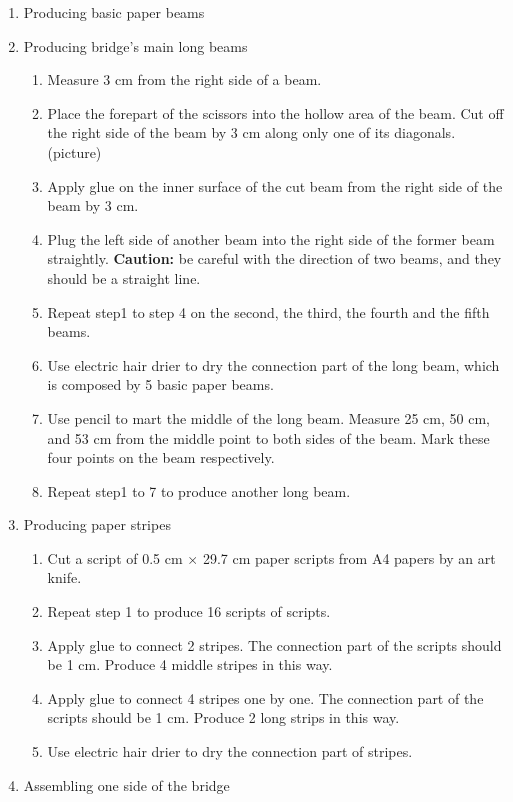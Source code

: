 \begin{enumerate}
\item Producing basic paper beams
\item Producing bridge’s main long beams
	\begin{enumerate}
	\item Measure 3 cm from the right side of a beam.
	\item Place the forepart of the scissors into the hollow area of the beam. Cut off the right side of the beam by 3 cm along only one of its diagonals.
	(picture)
	\item Apply glue on the inner surface of the cut beam from the right side of the beam by 3 cm.
	\item Plug the left side of another beam into the right side of the former beam straightly. 
	\textbf{Caution:} be careful with the direction of two beams, and they should be a straight line. 
	\item Repeat step1 to step 4 on the second, the third, the fourth and the fifth beams. 
	\item Use electric hair drier to dry the connection part of the long beam, which is composed by 5 basic paper beams. 
	\item Use pencil to mart the middle of the long beam. Measure 25 cm, 50 cm, and 53 cm from the middle point to both sides of the beam. Mark these four points on the beam respectively. 
	\item Repeat step1 to 7 to produce another long beam. 
	\end{enumerate}
\item Producing paper stripes
	\begin{enumerate}
	\item Cut a script of 0.5 cm $\times$ 29.7 cm paper scripts from A4 papers by an art knife. 
	\item Repeat step 1 to produce 16 scripts of scripts.
	\item Apply glue to connect 2 stripes. The connection part of the scripts should be 1 cm. Produce 4 middle stripes in this way.
	\item Apply glue to connect 4 stripes one by one. The connection part of the scripts should be 1 cm. Produce 2 long strips in this way.
	\item Use electric hair drier to dry the connection part of stripes.
	\end{enumerate}
\item Assembling one side of the bridge
	\begin{enumerate}

\end{enumerate}
\end{enumerate}
